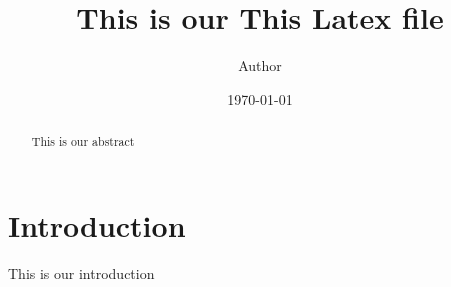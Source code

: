 \documentclass {article}
\title{This is our This Latex file}
\author{Author}
\date{\today}
\begin{document}
\maketitle %

\begin{abstract}
This is our abstract
\end{abstract}

\section{Introduction}
\label{sec:introduction}

This is our introduction
\end{document}

